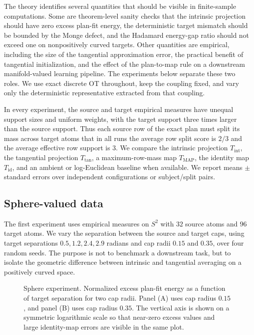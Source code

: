 \documentclass[10pt]{article} %
\theoremstyle{definition}
\providecommand{\1}{\mathbf{1}}
\begin{document}
The theory identifies several quantities that should be visible in finite-sample computations. Some are theorem-level sanity checks that the intrinsic projection should have zero excess plan-fit energy, the deterministic target mismatch should be bounded by the Monge defect, and the Hadamard energy-gap ratio should not exceed one on nonpositively curved targets. Other quantities are empirical, including the size of the tangential approximation error, the practical benefit of tangential initialization, and the effect of the plan-to-map rule on a downstream manifold-valued learning pipeline. The experiments below separate these two roles. We use exact discrete OT throughout, keep the coupling fixed, and vary only the deterministic representative extracted from that coupling.

In every experiment, the source and target empirical measures have unequal support sizes and uniform weights, with the target support three times larger than the source support. 
Thus each source row of the exact plan must split its mass across target atoms that in all runs the average row split score is \(2/3\) and the average effective row
support is \(3\). We compare the intrinsic projection $T_{\mathrm{int}}$, the tangential projection $T_{\mathrm{tan}}$, a maximum-row-mass map $T_{\mathrm{MAP}}$, the identity map $T_{\mathrm{id}}$, and an ambient or log-Euclidean baseline when available. We report means $\pm$ standard errors over independent configurations or subject/split pairs.

\subsection{Sphere-valued data}

The first experiment uses empirical measures on \(S^2\) with \(32\) source atoms
and \(96\) target atoms. We vary the separation between the source and target
caps, using target separations \(0.5,1.2,2.4,2.9\) radians and cap radii
\(0.15\) and \(0.35\), over four random seeds. The purpose is not to benchmark
a downstream task, but to isolate the geometric difference between intrinsic
and tangential averaging on a positively curved space.

\begin{figure}[t]
\centering
\resizebox{0.98\linewidth}{!}{%
	
}
\caption{Sphere experiment. Normalized excess plan-fit energy as a function of
target separation for two cap radii. Panel (A) uses cap radius \(0.15\), and
panel (B) uses cap radius \(0.35\). The vertical axis is shown on a symmetric
logarithmic scale so that near-zero excess values and large identity-map
errors are visible in the same plot.}
\label{fig:sphere-excess}
\end{figure}
\end{document}
